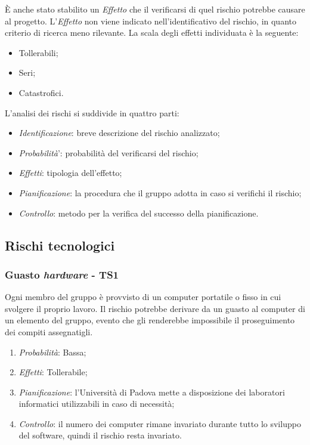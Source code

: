 \`E anche stato stabilito un \textit{Effetto} che il verificarsi di quel rischio potrebbe causare al progetto. L'\textit{Effetto} non viene indicato nell'identificativo del rischio, in quanto criterio di ricerca meno rilevante. La scala degli effetti individuata è la seguente:
\begin{itemize}
\item Tollerabili;
\item Seri;
\item Catastrofici.
\end{itemize}

L'analisi dei rischi si suddivide in quattro parti:
\begin{itemize}
\item \textit{Identificazione}: breve descrizione del rischio analizzato;
\item \textit{Probabilit\`a}': probabilit\`a del verificarsi del rischio;
\item \textit{Effetti}: tipologia dell'effetto;
\item \textit{Pianificazione}: la procedura che il gruppo adotta in caso si verifichi il rischio;
\item \textit{Controllo}: metodo per la verifica del successo della pianificazione.
\end{itemize}

\subsection{Rischi tecnologici}
\subsubsection{Guasto \textit{hardware} - TS1}
Ogni membro del gruppo \`e provvisto di un computer portatile o fisso in cui svolgere il proprio lavoro. Il rischio potrebbe derivare da un guasto al computer di un elemento del gruppo, evento che gli renderebbe impossibile il proseguimento dei compiti assegnatigli.
\begin{enumerate}
\item \textit{Probabilit\`a}: Bassa;
\item \textit{Effetti}: Tollerabile; 
\item \textit{Pianificazione}: l'Universit\`a di Padova mette a disposizione dei laboratori informatici utilizzabili
in caso di necessit\`a;
\item \textit{Controllo}: il numero dei computer rimane invariato durante tutto lo sviluppo del software, quindi il rischio resta invariato.
\end{enumerate}

